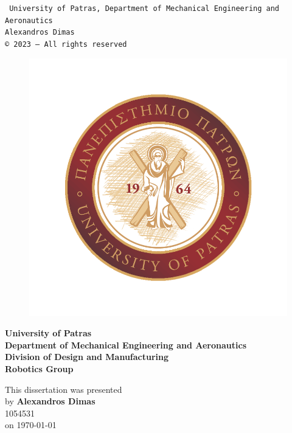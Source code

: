 \documentclass[twoside]{report}
\begin{document}
\noindent
{\tt
University of Patras, Department of Mechanical Engineering and Aeronautics\\
Alexandros Dimas\\ \copyright\ 2023 -- All rights reserved \newline
}
\newpage
\begin{minipage}{0.25\textwidth}
\begin{figure}[H]
\includegraphics[width =\textwidth]{images/logo-up-4color-stamp.png}
\end{figure}
\end{minipage} \hfill
\begin{minipage}{0.85\textwidth}
{
\large \textbf{University of Patras}\\
\large \textbf{Department of Mechanical Engineering and Aeronautics}\\
\large \textbf{Division of Design and Manufacturing}\\
\large \textbf{Robotics Group}
}
\end{minipage}

\vspace{4cm}
\begin{center}
    This dissertation was presented \\ by \textbf{Alexandros Dimas} \\ 1054531 \\ 
    \vspace{2cm}
    on \today
\end{center}
\end{document}
